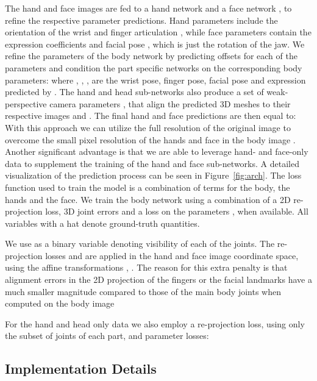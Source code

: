 \documentclass[runningheads]{llncs}
\newcommand{\groundtruth}{\mbox{ground-truth}\xspace}
\newcommand{\twoD}{2D\xspace}
\newcommand{\threeD}{3D\xspace}
\begin{document}
The hand  and face  images are fed to a hand network  and a face network ,
to refine the respective parameter predictions. Hand parameters 
include the orientation of the wrist 
and finger articulation ,
while face parameters contain the expression coefficients  and
facial pose , which is just the rotation of the jaw.
We refine the parameters of the body network by predicting offsets for each of the parameters and condition the part specific networks
on the corresponding body parameters:
\noindent where , ,
, 
are the wrist pose, finger pose, facial pose and expression predicted by .
The hand and head sub-networks also produce a set of weak-perspective camera parameters ,
 that align the predicted \threeD meshes to their respective images
 and . The final hand and face predictions are then equal to:
With this approach we can utilize the full resolution of the original image 
to overcome the small pixel resolution of the hands and face in the body image .
Another significant advantage is that we are able to leverage hand- and face-only data
to supplement the training of the hand and face sub-networks.
A detailed visualization of the prediction process can be seen in Figure~\ref{fig:arch}.
The loss function used to train the model is a combination of terms for the
body, the hands and the face. We train the body network using a combination of a \twoD re-projection loss, \threeD joint errors and a loss on the parameters ,
when available. All variables with a hat denote \groundtruth quantities.

We use  as a binary variable denoting visibility of each of the  joints.
The re-projection losses  and 
are applied in the hand and face image coordinate space,
using the affine transformations , . The reason for this extra penalty is that
alignment errors in the \twoD projection of the fingers or the facial landmarks have a much smaller magnitude compared
to those of the main body joints when computed on the body image 


For the hand and head only data we also employ a re-projection loss, using only
the subset of joints of each part, and parameter losses:

 \subsection{Implementation Details}
\label{subsection:impl}
\end{document}
